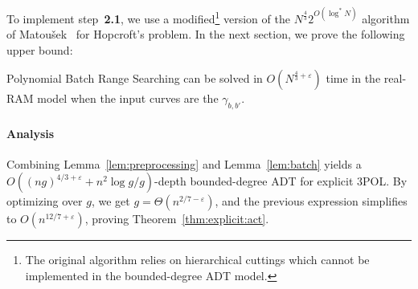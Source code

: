 To implement step~\textbf{2.1}, we use a modified\footnote{The original
algorithm relies on hierarchical cuttings which cannot be
implemented in the bounded-degree ADT model.}
version of the $N^{\frac{4}{3}} 2^{O(\log^* N)}$ algorithm of
Matou\v{s}ek~\cite{Ma93} for Hopcroft's problem.
%
%
%
%
In the next section, we prove the following upper bound:
\begin{lemma}\label{lem:batch}
Polynomial Batch Range Searching can be solved in
$O(N^{\frac{4}{3}+\varepsilon})$ time in the real-RAM model when the input
curves are the $\gamma_{b,b'}$.
\end{lemma}


\paragraph{Analysis}
Combining Lemma~\ref{lem:preprocessing} and Lemma~\ref{lem:batch} yields a $O(
{(ng)}^{4/3+\varepsilon} + n^2 \log g / g)$-depth bounded-degree ADT for
explicit 3POL\@. By optimizing over $g$, we get $g = \Theta(n^{2/7-\varepsilon})$, and
the previous expression simplifies to $O(n^{12/7+\varepsilon})$, proving
Theorem~\ref{thm:explicit:act}.
